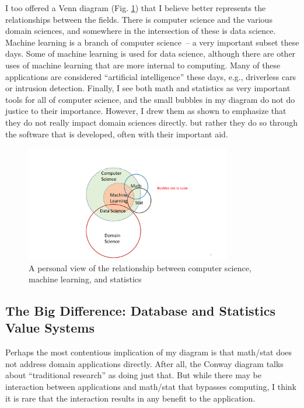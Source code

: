\documentclass[11pt]{article}
\begin{document}
I too offered a Venn diagram (Fig. \ref{myvenn-fig}) that I believe better represents the relationships between the fields.  There is computer science and the various domain sciences, and somewhere in the intersection of these is data science.  Machine learning is a branch of computer science~-- a very important subset these days.  Some of machine learning is used for data science, although there are other uses of machine learning that are more internal to computing.  Many of these applications are considered ``artificial intelligence'' these days, e.g., driverless cars or intrusion detection.  Finally, I see both math and statistics as very important tools for all of computer science, and the small bubbles in my diagram do not do justice to their importance.  However, I drew them as shown to emphasize that they do not really impact domain sciences directly.  but rather they do so through the software that is developed, often with their important aid.

\begin{figure}[h]
\centerline{\includegraphics[width=0.8\textwidth]{letters/myvenn.pdf}}
\caption{A personal view of the relationship between computer science, machine learning, and statistics}
\label{myvenn-fig}
\end{figure}

\subsection{The Big Difference: Database and Statistics Value Systems}

Perhaps the most contentious implication of my diagram is that math/stat does not address domain applications directly.  After all, the Conway diagram talks about ``traditional research'' as doing just that.  But while there may be interaction between applications and math/stat that bypasses computing, I think it is rare that the interaction results in any benefit to the application.
\end{document}
